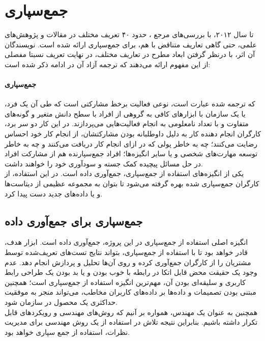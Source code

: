 \section{جمع‌سپاری}
تا سال ۲۰۱۲، با بررسی‌های مرجع 
\cite{estelles-arolas_towards_2012}،
حدود ۴۰ تعریف مختلف در مقالات و پژوهش‌های علمی، حتی گاهی تعاریف متناقض با هم، برای جمع‌سپاری ارائه شده است. نویسندگان آن اثر، با درنظر گرفتن ابعاد مطرح در تعاریف مختلف، در نهایت تعریف نسبتا مفصلی از این مفهوم ارائه می‌دهند که ترجمه آزاد آن در ادامه ذکر شده است: 
\paragraph{جمع‌سپاری}
که ترجمه شده عبارت
است، نوعی فعالیت برخط
مشارکتی است که طی آن یک فرد، یا یک سازمان با ابزارهای کافی به گروهی از افراد با سطح دانش متغیر و گونه‌های متفاوت و با تعداد نامعلومی به انجام فعالیت‌هایی می‌پردازند. در این کار دو سر برد، کارگران انجام دهنده کار
به دلیل داوطلبانه بودن مشارکتشان، از انجام کار خود احساس رضایت می‌کنند؛ چه به خاطر پولی که در ازای انجام کار دریافت می‌کنند و چه به خاطر توسعه مهارت‌های شخصی و یا سایر انگیزه‌ها؛ افراد جمع‌سپارنده هم از مشارکت افراد در حل مسائل پیچیده کمک جسته و سودآوری خود را خواهند داشت. \\
یکی از انگیزه‌های استفاده از جمع‌سپاری، جمع‌آوری داده
است. در این استفاده، از کارگران جمع‌سپاری شده بهره گرفته می‌شود تا بتوان به مجموعه عظیمی از دیتاست‌ها و یا داده‌های جدید دست پیدا کرد.
\subsection{جمع‌سپاری برای جمع‌آوری داده}
انگیزه اصلی استفاده از جمع‌سپاری در این پروژه، جمع‌آوری داده است. ابزار هدف، قادر خواهد بود تا با استفاده از جمع‌سپاری، بتواند نتایج تست‌های تعریف‌شده توسط مشتریان را از کارگران جمع‌آوری کرده و روی آن‌ها تحلیل و پردازش انجام دهد. عدم وجود یک حقیقت محض قابل اتکا
در رابطه با خوب بودن و یا بد بودن یک طراحی رابط کاربری و سلیقه‌ای بودن آن، مهم‌ترین انگیزه استفاده از جمع‌سپاری است؛ همچنین مبتنی بودن تصمیمات و داده‌ها بر داده‌های کاربران مخاطب، می‌تواند منجر به موفقیت حداکثری یک محصول در سازمان شود.\\
همچنین به عنوان یک مهندس، همواره بر آنیم که روش‌های مهندسی و رویکردهای قابل تکرار داشته باشیم. بنابراین نتیجه تلاش در استفاده از یک روش مهندسی برای مدیریت نظرات، استفاده از جمع سپاری خواهد بود.
